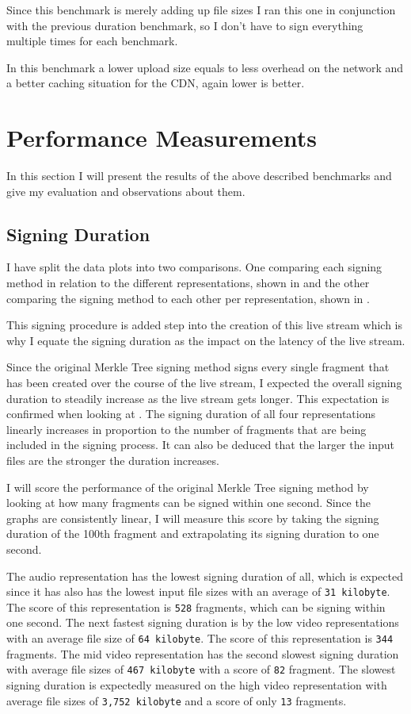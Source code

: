Since this benchmark is merely adding up file sizes I ran this one in conjunction with the previous duration benchmark, so I don't have to sign everything multiple times for each benchmark.

In this benchmark a lower upload size equals to less overhead on the network and a better caching situation for the CDN, again lower is better.

\section{Performance Measurements\label{sec:performance}}

In this section I will present the results of the above described benchmarks and give my evaluation and observations about them.

\subsection{Signing Duration}

I have split the data plots into two comparisons. One comparing each signing method in relation to the different representations, shown in  and the other comparing the signing method to each other per representation, shown in .

This signing procedure is added step into the creation of this live stream which is why I equate the signing duration as the impact on the latency of the live stream.

Since the original Merkle Tree signing method signs every single fragment that has been created over the course of the live stream, I expected the overall signing duration to steadily increase as the live stream gets longer. This expectation is confirmed when looking at . The signing duration of all four representations linearly increases in proportion to the number of fragments that are being included in the signing process. It can also be deduced that the larger the input files are the stronger the duration increases. 

I will score the performance of the original Merkle Tree signing method by looking at how many fragments can be signed within one second. Since the graphs are consistently linear, I will measure this score by taking the signing duration of the 100th fragment and extrapolating its signing duration to one second.

The audio representation has the lowest signing duration of all, which is expected since it has also has the lowest input file sizes with an average of \texttt{31 kilobyte}. The score of this representation is \texttt{528} fragments, which can be signing within one second. The next fastest signing duration is by the low video representations with an average file size of \texttt{64 kilobyte}. The score of this representation is \texttt{344} fragments. The mid video representation has the second slowest signing duration with average file sizes of \texttt{467 kilobyte} with a score of \texttt{82} fragment. The slowest signing duration is expectedly measured on the high video representation with average file sizes of \texttt{3,752 kilobyte} and a score of only \texttt{13} fragments.


